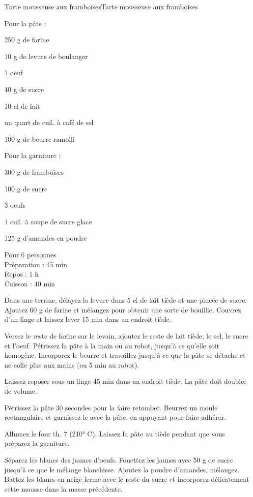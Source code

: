 \begin{recette}{Tarte mousseuse aux framboises}{Tarte mousseuse aux framboises}

\begin{ingredients}
Pour la pâte :\par
	250 g de farine\par
	10 g de levure de boulanger\par
	1 oeuf\par
	40 g de sucre\par
	10 cl de lait\par
	un quart de cuil. à café de sel\par
	100 g de beurre ramolli\par
Pour la garniture :\par
	300 g de framboises \par
	100 g de sucre\par
	3 oeufs\par
	1 cuil. à soupe de sucre glace\par
	125 g d’amandes en poudre\par
\end{ingredients}

\begin{infos}
Pour 6 personnes\\
Préparation : 45 min\\
Repos : 1 h\\
Cuisson : 40 min\\
\end{infos}

\begin{etapes}
\item Dans une terrine, délayez la levure dans 5 cl de lait tiède et une pincée de sucre. Ajoutez 60 g de farine et mélangez pour obtenir une sorte de bouillie. Couvrez d’un linge et laissez lever 15 min dans un endroit tiède.
\item Versez le reste de farine sur le levain, ajoutez le reste de lait tiède, le sel, le sucre et l’oeuf. Pétrissez la pâte à la main ou au robot, jusqu’à ce qu’elle soit homogène. Incorporez le beurre et travaillez jusqu’à ce que la pâte se détache et ne colle plus aux mains (ou 5 min au robot).
\item Laissez reposer sous un linge 45 min dans un endroit tiède. La pâte doit doubler de volume.
\item Pétrissez la pâte 30 secondes pour la faire retomber. Beurrez un moule rectangulaire et garnissez-le avec la pâte, en appuyant pour faire adhérer.
\item Allumez le four th. 7 (210° C). Laissez la pâte au tiède pendant que vous préparez la garniture.
\item Séparez les blancs des jaunes d’oeufs. Fouettez les jaunes avec 50 g de sucre jusqu’à ce que le mélange blanchisse. Ajoutez la poudre d’amandes, mélangez. Battez les blancs en neige ferme avec le reste du sucre et incorporez délicatement cette mousse dans la masse précédente.
\end{etapes}


\end{recette}
